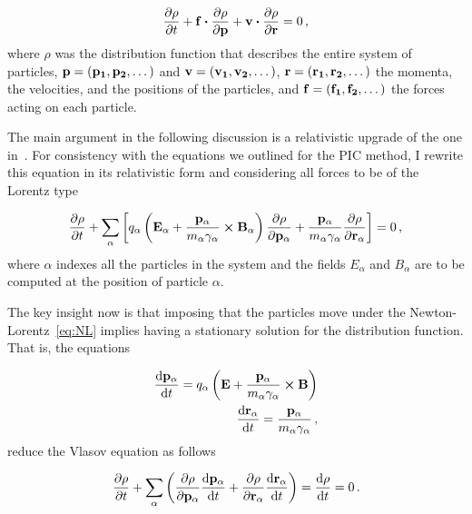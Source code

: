 \documentclass[12pt, class=report, crop=false]{standalone}
\begin{document}
\begin{equation}
  \pdv{\rho}{t} + \vb{f}\vdot\pdv{\rho}{\vb{p}} + \vb{v}\vdot\pdv{\rho}{\vb{r}} = 0\,,
\end{equation}
where \(\rho\) was the distribution function that describes the entire system of particles, \(\vb{p}=(\vb{p_1}, \vb{p_2},\dots )\) and \(\vb{v}=(\vb{v_1}, \vb{v_2},\dots )\), \(\vb{r}=(\vb{r_1}, \vb{r_2},\dots )\) the momenta, the velocities, and the positions of the particles, and \(\vb{f}=(\vb{f_1}, \vb{f_2},\dots )\) the forces acting on each particle.

The main argument in the following discussion is a relativistic upgrade of the one in~\cite{liuHighPowerLaserPlasmaInteraction2020}. For consistency with the equations we outlined for the PIC method, I rewrite this equation in its relativistic form and considering all forces to be of the Lorentz type

\begin{equation}
  \pdv{\rho}{t} + \sum_\alpha \left[ q_\alpha \left(\vb{E_\alpha}+\frac{\vb{p_\alpha}}{m_\alpha \gamma_\alpha} \cp \vb{B_\alpha} \right) \pdv{\rho}{\vb{p_\alpha}} +  \frac{\vb{p_\alpha}}{m_\alpha \gamma_\alpha} \pdv{\rho}{\vb{r_\alpha}}\right] =0\,,
\end{equation}
where \(\alpha\) indexes all the particles in the system and the fields \(E_\alpha\) and \(B_\alpha\) are to be computed at the position of particle \(\alpha\).

The key insight now is that imposing that the particles move under the Newton-Lorentz~\cref{eq:NL} implies having a stationary solution for the distribution function. That is, the equations

\begin{subequations}
  \label{eq:boris1}
  \begin{align}
    \dv{\vb{p_\alpha}}{t} = q_\alpha \left(\vb{E}+\frac{\vb{p_\alpha}}{m_\alpha \gamma_\alpha} \cp \vb{B} \right)\\
    \dv{\vb{r_\alpha}}{t} = \frac{\vb{p_\alpha}}{m_\alpha \gamma_\alpha}\,,
  \end{align}
\end{subequations}
reduce the Vlasov equation as follows

\begin{equation}
  \pdv{\rho}{t} + \sum_\alpha \left( \pdv{\rho}{\vb{p_\alpha}}\dv{\vb{p_\alpha}}{t} + \pdv{\rho}{\vb{r_\alpha}} \dv{\vb{r_\alpha}}{t} \right) = \dv{\rho}{t} = 0 \,.
\end{equation}
\end{document}
